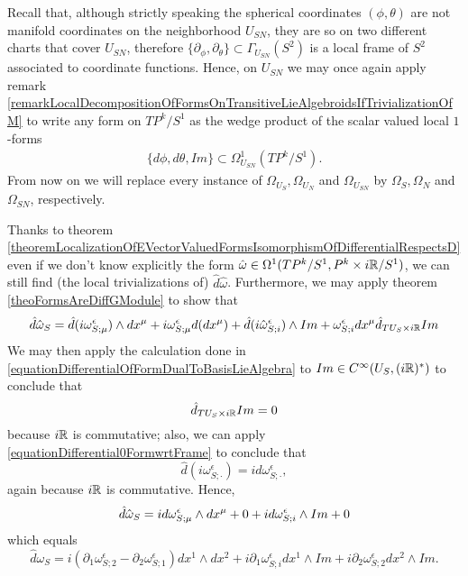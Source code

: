 \begin{example}[$TP^k/S^1$ over $S^2$]
Recall that, although strictly speaking the spherical coordinates $(\phi, \theta)$ are not manifold coordinates on the neighborhood $U_{SN}$, they are so on two different charts that cover $U_{SN}$, therefore $\{\partial_\phi, \partial_\theta\} \subset \Gamma_{U_{SN}}(S^2)$ is a local frame of $S^2$ associated to coordinate functions. Hence, on $U_{SN}$ we may once again apply remark \ref{remarkLocalDecompositionOfFormsOnTransitiveLieAlgebroidsIfTrivializationOfM} to write any form on $TP^k/S^1$ as the wedge product of the scalar valued local $1$-forms
\begin{align*}
    \{d\phi, d\theta, Im\} \subset \Omega^1_{U_{SN}}(TP^k/S^1).
\end{align*} 
From now on we will replace every instance of $\Omega_{U_{S}}, \Omega_{U_{N}}$ and $\Omega_{U_{SN}}$ by $\Omega_{S}, \Omega_{N}$ and $\Omega_{SN}$, respectively.

Thanks to theorem \ref{theoremLocalizationOfEVectorValuedFormsIsomorphismOfDifferentialRespectsD} even if we don't know explicitly the form $\hat \omega \in \Omega^1(TP^k/S^1, P^k \times i\mathbb{R}/S^1)$, we can still find (the local trivializations of) $\hat d \hat \omega$. Furthermore, we may apply theorem \ref{theoFormsAreDiffGModule} to show that
\begin{equation*}
    \hat d \hat \omega_S = \hat d (i\omega^\epsilon_{S;\mu}) \wedge dx^\mu + i  \omega^\epsilon_{S;\mu} d(dx^\mu) + \hat d(i \hat \omega^\epsilon_{S;i}) \wedge Im + \omega^\epsilon_{S;i} dx^\mu \hat d_{TU_S \times i\RR} Im
\end{equation*}
We may then apply the calculation done in \eqref{equationDifferentialOfFormDualToBasisLieAlgebra} to $Im \in C^\infty(U_S, (i \mathbb{R})^*)$ to conclude that 
$$\hat d_{TU_S \times i\mathbb{R}} Im = 0$$
because $i\mathbb{R}$ is commutative; also, we can apply \eqref{equationDifferential0FormwrtFrame} to conclude that
$$ \hat d (i \omega^\epsilon_{S;\cdot}) = i d\omega^\epsilon_{S;\cdot},$$
again because $i\mathbb{R}$ is commutative. Hence,
\begin{equation*}
    \hat d \hat \omega_S = i d\omega^\epsilon_{S;\mu}\wedge dx^\mu + 0 + i d\omega^\epsilon_{S;i} \wedge Im + 0\\
\end{equation*}
which equals
\begin{equation}\label{equationCurvatureGeneralConnectionCh2S2}
    \hat d \omega_S = i(\partial_1 \omega^\epsilon_{S;2} - \partial_2 \omega^\epsilon_{S;1}) dx^1 \wedge dx^2 + i \partial_1 \omega^\epsilon_{S;i} dx^1 \wedge Im + i \partial_2 \omega^\epsilon_{S;2} dx^2 \wedge Im.
\end{equation}

\end{example}

